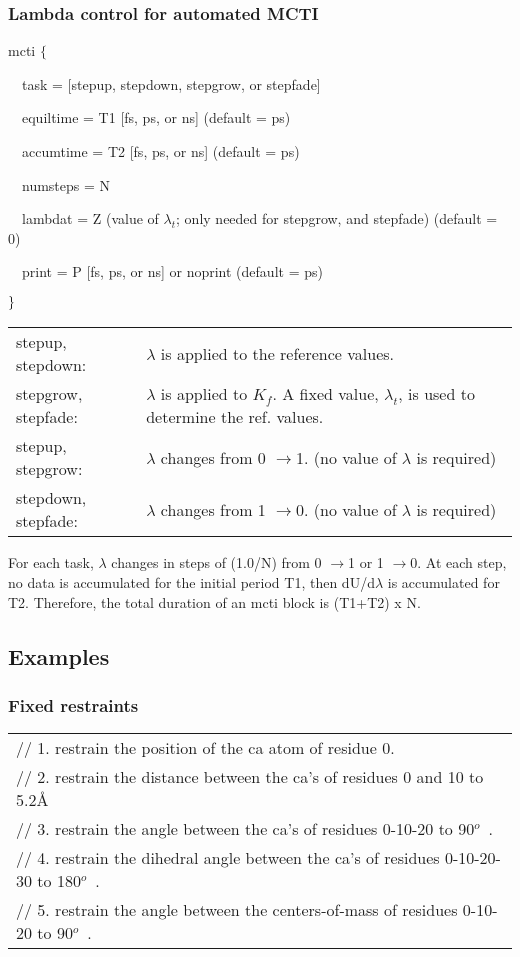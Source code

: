 \subsubsection{Lambda control for automated MCTI}

mcti $\{$

~~task = [stepup, stepdown, stepgrow, or stepfade]

~~equiltime = T1 [fs, ps, or ns] (default = ps)

~~accumtime = T2 [fs, ps, or ns] (default = ps)

~~numsteps = N

~~lambdat = Z (value of $\lambda _{t}$; only needed for stepgrow, and
stepfade) (default = 0)

~~print = P [fs, ps, or ns] or noprint (default = ps)

$\}\medskip $

\begin{tabular}{ll}
stepup, stepdown: & $\lambda $ is applied to the reference values. \\ 
stepgrow, stepfade: & $\lambda $ is applied to $K_{f}$. A fixed value, $%
\lambda _{t}$, is used to determine the ref. values. \\ 
stepup, stepgrow: & $\lambda $ changes from 0 $\rightarrow $1. (no value of $%
\lambda $ is required) \\ 
stepdown, stepfade: & $\lambda $ changes from 1 $\rightarrow $0. (no value
of $\lambda $ is required)\medskip
\end{tabular}

For each task, $\lambda $ changes in steps of (1.0/N) from 0 $\rightarrow $1
or 1 $\rightarrow $0. At each step, no data is accumulated for the initial
period T1, then dU/d$\lambda $ is accumulated for T2. Therefore, the total
duration of an mcti block is (T1+T2) x N.

\subsection{Examples}

\subsubsection{Fixed restraints}

\begin{tabular}{l}
{\footnotesize // 1. restrain the position of the ca atom of residue 0.} \\ 
{\footnotesize // 2. restrain the distance between the ca's of residues 0
and 10 to 5.2\AA } \\ 
{\footnotesize // 3. restrain the angle between the ca's of residues 0-10-20
to 90}$^{o}${\footnotesize \ .} \\ 
{\footnotesize // 4. restrain the dihedral angle between the ca's of
residues 0-10-20-30 to 180}$^{o}${\footnotesize \ .} \\ 
{\footnotesize // 5. restrain the angle between the centers-of-mass of
residues 0-10-20 to 90}$^{o}${\footnotesize \ .}
\end{tabular}

